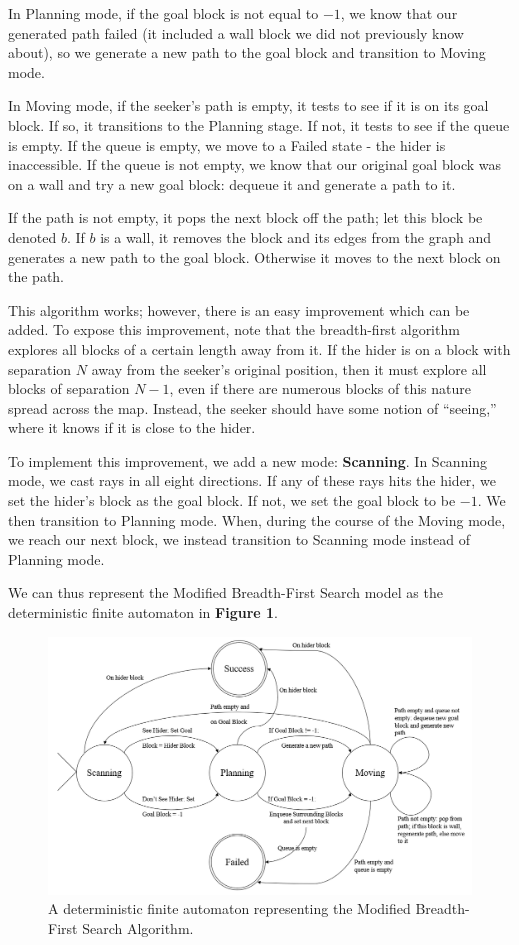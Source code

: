 \documentclass[12pt]{article}
\begin{document}
In Planning mode, if the goal block is not equal to $ -1 $, we know that our generated path failed (it included a wall block we did not previously know about), so we generate a new path to the goal block and transition to Moving mode. 

In Moving mode, if the seeker's path is empty, it tests to see if it is on its goal block. If so, it transitions to the Planning stage. If not, it tests to see if the queue is empty. If the queue is empty, we move to a Failed state - the hider is inaccessible. If the queue is not empty, we know that our original goal block was on a wall and try a new goal block: dequeue it and generate a path to it.

If the path is not empty, it pops the next block off the path; let this block be denoted $ b $. If $ b $ is a wall, it removes the block and its edges from the graph and generates a new path to the goal block. Otherwise it moves to the next block on the path.

This algorithm works; however, there is an easy improvement which can be added. To expose this improvement, note that the breadth-first algorithm explores all blocks of a certain length away from it. If the hider is on a block with separation $ N $ away from the seeker's original position, then it must explore all blocks of separation $ N - 1 $, even if there are numerous blocks of this nature spread across the map. Instead, the seeker should have some notion of ``seeing,'' where it knows if it is close to the hider.

To implement this improvement, we add a new mode: \textbf{Scanning}. In Scanning mode, we cast rays in all eight directions. If any of these rays hits the hider, we set the hider's block as the goal block. If not, we set the goal block to be $ -1 $. We then transition to Planning mode. When, during the course of the Moving mode, we reach our next block, we instead transition to Scanning mode instead of Planning mode. 

We can thus represent the Modified Breadth-First Search model as the deterministic finite automaton in \textbf{Figure 1}.

\begin{figure}[htbp]
\includegraphics[width=1\linewidth]{bfsfa.PNG} 
\caption{A deterministic finite automaton representing the Modified Breadth-First Search Algorithm.}
\end{figure} 
\end{document}
